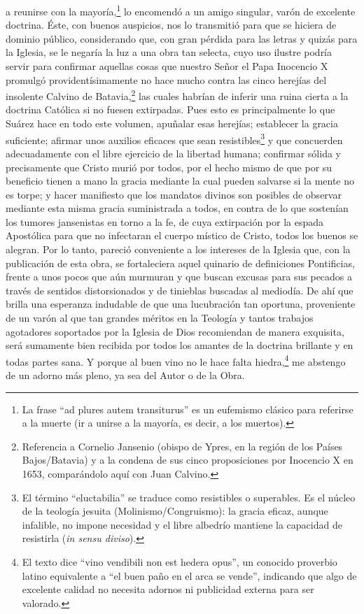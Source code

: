 \documentclass{article}
\begin{document}
a reunirse con la mayoría,\footnote{La frase \enquote{ad plures autem transiturus} es un
eufemismo clásico para referirse a la muerte (ir a unirse a la mayoría, es decir, a los
muertos).} lo encomendó a un amigo singular, varón de excelente doctrina. Éste, con
buenos auspicios, nos lo transmitió para que se hiciera de dominio público, considerando
que, con gran pérdida para las letras y quizás para la Iglesia, se le negaría la luz a
una obra tan selecta, cuyo uso ilustre podría servir para confirmar aquellas cosas que
nuestro Señor el Papa Inocencio X promulgó providentísimamente no hace mucho contra las
cinco herejías del insolente Calvino de Batavia,\footnote{Referencia a Cornelio Jansenio
(obispo de Ypres, en la región de los Países Bajos/Batavia) y a la condena de sus cinco
proposiciones por Inocencio X en 1653, comparándolo aquí con Juan Calvino.} las cuales
habrían de inferir una ruina cierta a la doctrina Católica si no fuesen extirpadas. Pues
esto es principalmente lo que Suárez hace en todo este volumen, apuñalar esas herejías;
establecer la gracia suficiente; afirmar unos auxilios eficaces que sean
resistibles\footnote{El término \enquote{eluctabilia} se traduce como resistibles o
superables. Es el núcleo de la teología jesuita (Molinismo/Congruismo): la gracia
eficaz, aunque infalible, no impone necesidad y el libre albedrío mantiene la capacidad
de resistirla (\textit{in sensu diviso}).} y que concuerden adecuadamente con el libre
ejercicio de la libertad humana; confirmar sólida y precisamente que Cristo murió por
todos, por el hecho mismo de que por su beneficio tienen a mano la gracia mediante la
cual pueden salvarse si la mente no es torpe; y hacer manifiesto que los mandatos
divinos son posibles de observar mediante esta misma gracia suministrada a todos, en
contra de lo que sostenían los tumores jansenistas en torno a la fe, de cuya extirpación
por la espada Apostólica para que no infectaran el cuerpo místico de Cristo, todos los
buenos se alegran. Por lo tanto, pareció conveniente a los intereses de la Iglesia que,
con la publicación de esta obra, se fortaleciera aquel quinario de definiciones
Pontificias, frente a unos pocos que aún murmuran y que buscan excusas para sus pecados
a través de sentidos distorsionados y de tinieblas buscadas al mediodía. De ahí que
brilla una esperanza indudable de que una lucubración tan oportuna, proveniente de un
varón al que tan grandes méritos en la Teología y tantos trabajos agotadores soportados
por la Iglesia de Dios recomiendan de manera exquisita, será sumamente bien recibida por
todos los amantes de la doctrina brillante y en todas partes sana. Y porque al buen vino
no le hace falta hiedra,\footnote{El texto dice \enquote{vino vendibili non est hedera
opus}, un conocido proverbio latino equivalente a \enquote{el buen paño en el arca se
vende}, indicando que algo de excelente calidad no necesita adornos ni publicidad
externa para ser valorado.} me abstengo de un adorno más pleno, ya sea del Autor o de la
Obra.
\end{document}
